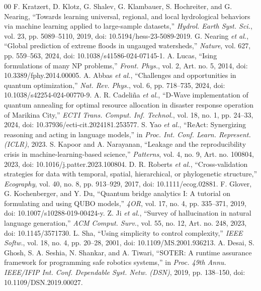 \documentclass[conference]{IEEEtran}
\begin{document}
\balance
\begin{thebibliography}{00}
 F. Kratzert, D. Klotz, G. Shalev, G. Klambauer, S. Hochreiter, and G. Nearing, ``Towards learning universal, regional, and local hydrological behaviors via machine learning applied to large-sample datasets,'' \textit{Hydrol. Earth Syst. Sci.}, vol. 23, pp. 5089--5110, 2019, doi: 10.5194/hess-23-5089-2019.
 G. Nearing \textit{et al.}, ``Global prediction of extreme floods in ungauged watersheds,'' \textit{Nature}, vol. 627, pp. 559--563, 2024, doi: 10.1038/s41586-024-07145-1.
 A. Lucas, ``Ising formulations of many NP problems,'' \textit{Front. Phys.}, vol. 2, Art. no. 5, 2014, doi: 10.3389/fphy.2014.00005.
 A. Abbas \textit{et al.}, ``Challenges and opportunities in quantum optimization,'' \textit{Nat. Rev. Phys.}, vol. 6, pp. 718--735, 2024, doi: 10.1038/s42254-024-00770-9.
 A. R. Cadeli\~{n}a \textit{et al.}, ``D-Wave implementation of quantum annealing for optimal resource allocation in disaster response operation of Marikina City,'' \textit{ECTI Trans. Comput. Inf. Technol.}, vol. 18, no. 1, pp. 24--33, 2024, doi: 10.37936/ecti-cit.2024181.253577.
 S. Yao \textit{et al.}, ``ReAct: Synergizing reasoning and acting in language models,'' in \textit{Proc. Int. Conf. Learn. Represent. (ICLR)}, 2023.
 S. Kapoor and A. Narayanan, ``Leakage and the reproducibility crisis in machine-learning-based science,'' \textit{Patterns}, vol. 4, no. 9, Art. no. 100804, 2023, doi: 10.1016/j.patter.2023.100804.
 D. R. Roberts \textit{et al.}, ``Cross-validation strategies for data with temporal, spatial, hierarchical, or phylogenetic structure,'' \textit{Ecography}, vol. 40, no. 8, pp. 913--929, 2017, doi: 10.1111/ecog.02881.
 F. Glover, G. Kochenberger, and Y. Du, ``Quantum bridge analytics I: A tutorial on formulating and using QUBO models,'' \textit{4OR}, vol. 17, no. 4, pp. 335--371, 2019, doi: 10.1007/s10288-019-00424-y.
 Z. Ji \textit{et al.}, ``Survey of hallucination in natural language generation,'' \textit{ACM Comput. Surv.}, vol. 55, no. 12, Art. no. 248, 2023, doi: 10.1145/3571730.
 L. Sha, ``Using simplicity to control complexity,'' \textit{IEEE Softw.}, vol. 18, no. 4, pp. 20--28, 2001, doi: 10.1109/MS.2001.936213.
 A. Desai, S. Ghosh, S. A. Seshia, N. Shankar, and A. Tiwari, ``SOTER: A runtime assurance framework for programming safe robotics systems,'' in \textit{Proc. 49th Annu. IEEE/IFIP Int. Conf. Dependable Syst. Netw. (DSN)}, 2019, pp. 138--150, doi: 10.1109/DSN.2019.00027.

\end{thebibliography}
\end{document}
